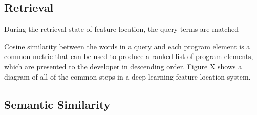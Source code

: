 \subsection{Retrieval}

During the retrieval state of feature location, the query terms are
matched 








Cosine similarity between the words in a query and each program
element is a common metric that can be used to produce a ranked list
of program elements, which are presented to the developer in
descending order. Figure X shows a diagram of all of the common steps
in a deep learning feature location system.






\subsection{Semantic Similarity}
